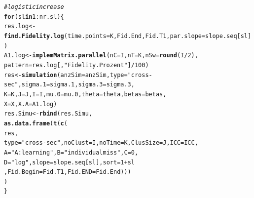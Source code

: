 \documentclass{article}\usepackage[]{graphicx}\usepackage[]{color}
\makeatletter
\newcommand{\hlnum}[1]{\textcolor[rgb]{0.686,0.059,0.569}{#1}}%
\newcommand{\hlstr}[1]{\textcolor[rgb]{0.192,0.494,0.8}{#1}}%
\newcommand{\hlcom}[1]{\textcolor[rgb]{0.678,0.584,0.686}{\textit{#1}}}%
\newcommand{\hlopt}[1]{\textcolor[rgb]{0,0,0}{#1}}%
\newcommand{\hlstd}[1]{\textcolor[rgb]{0.345,0.345,0.345}{#1}}%
\newcommand{\hlkwa}[1]{\textcolor[rgb]{0.161,0.373,0.58}{\textbf{#1}}}%
\newcommand{\hlkwb}[1]{\textcolor[rgb]{0.69,0.353,0.396}{#1}}%
\newcommand{\hlkwc}[1]{\textcolor[rgb]{0.333,0.667,0.333}{#1}}%
\newcommand{\hlkwd}[1]{\textcolor[rgb]{0.737,0.353,0.396}{\textbf{#1}}}%
\newenvironment{kframe}{%
 \def\at@end@of@kframe{}%
 \ifinner\ifhmode%
  \def\at@end@of@kframe{\end{minipage}}%
  \begin{minipage}{\columnwidth}%
 \fi\fi%
 \def\FrameCommand##1{\hskip\@totalleftmargin \hskip-\fboxsep
 \colorbox{shadecolor}{##1}\hskip-\fboxsep
     \hskip-\linewidth \hskip-\@totalleftmargin \hskip\columnwidth}%
 \MakeFramed {\advance\hsize-\width
   \@totalleftmargin\z@ \linewidth\hsize
   \@setminipage}}%
 {\par\unskip\endMakeFramed%
 \at@end@of@kframe}
\newenvironment{knitrout}{}{} %
\makeatother
\begin{document}
\begin{knitrout}
\begin{kframe}
{\ttfamily\noindent\color{warningcolor}{\#\# Warning in optwrap(optimizer, devfun, x@theta, lower = x@lower, calc.derivs = TRUE, : convergence code 3 from bobyqa: bobyqa -- a trust region step failed to reduce q}}\begin{alltt}
\hlcom{#logistic increase}
\hlkwa{for}\hlstd{(sl} \hlkwa{in} \hlnum{1}\hlopt{:}\hlstd{nr.sl)\{}
    \hlstd{res.log}\hlkwb{<-}\hlkwd{find.Fidelity.log}\hlstd{(}\hlkwc{time.points}\hlstd{=K, Fid.End, Fid.T1,} \hlkwc{par.slope}\hlstd{=slope.seq[sl])}
    \hlstd{A1.log} \hlkwb{<-}\hlkwd{implemMatrix.parallel}\hlstd{(}\hlkwc{nC}\hlstd{=I,} \hlkwc{nT}\hlstd{=K,} \hlkwc{nSw}\hlstd{=}\hlkwd{round}\hlstd{(I}\hlopt{/}\hlnum{2}\hlstd{),}
                                   \hlkwc{pattern}\hlstd{=res.log[,}\hlstr{"Fidelity.Prozent"}\hlstd{]}\hlopt{/}\hlnum{100}\hlstd{)}
    \hlstd{res}\hlkwb{<-}\hlkwd{simulation}\hlstd{(}\hlkwc{anzSim}\hlstd{=anzSim,}\hlkwc{type}\hlstd{=}\hlstr{"cross-sec"}\hlstd{,} \hlkwc{sigma.1}\hlstd{=sigma.1,}\hlkwc{sigma.3}\hlstd{=sigma.3,}
                       \hlkwc{K}\hlstd{=K,}\hlkwc{J}\hlstd{=J,}\hlkwc{I}\hlstd{=I,}\hlkwc{mu.0}\hlstd{=mu.0,} \hlkwc{theta}\hlstd{=theta,}\hlkwc{betas}\hlstd{=betas,}
                       \hlkwc{X}\hlstd{=X,} \hlkwc{X.A}\hlstd{=A1.log)}
    \hlstd{res.Simu}\hlkwb{<-}\hlkwd{rbind}\hlstd{(res.Simu,}
                    \hlkwd{as.data.frame}\hlstd{(}\hlkwd{t}\hlstd{(}\hlkwd{c}\hlstd{(}
                      \hlstd{res,}
                      \hlkwc{type}\hlstd{=}\hlstr{"cross-sec"}\hlstd{,} \hlkwc{noClust}\hlstd{=I,} \hlkwc{noTime}\hlstd{=K,} \hlkwc{ClusSize}\hlstd{=J,}  \hlkwc{ICC}\hlstd{=ICC,}
                      \hlkwc{A}\hlstd{=}\hlstr{"A: learning"}\hlstd{,} \hlkwc{B}\hlstd{=}\hlstr{"individual miss"}\hlstd{,} \hlkwc{C}\hlstd{=}\hlnum{0}\hlstd{,}
                      \hlkwc{D}\hlstd{=}\hlstr{"log"}\hlstd{,} \hlkwc{slope}\hlstd{=slope.seq[sl],} \hlkwc{sort}\hlstd{=}\hlnum{1}\hlopt{+}\hlstd{sl}
                      \hlstd{,} \hlkwc{Fid.Begin}\hlstd{=Fid.T1,} \hlkwc{Fid.END}\hlstd{=Fid.End)))}
    \hlstd{)}
  \hlstd{\}}
\end{alltt}



\end{kframe}
\end{knitrout}
\end{document}
